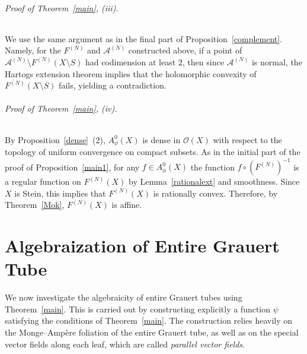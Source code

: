 \documentclass[a4paper, 12pt]{article}
\newcommand{\cO}{\mathcal{O}}
\newcommand{\cA}{\mathcal{A}}
\newtheorem{defn}[thm]{Definition}
\begin{document}
\paragraph{Proof of Theorem~\ref{main}, (iii).}
We use the same argument as in the final part of Proposition~\ref{complement}. Namely, for the $F^{(N)}$ and $\cA^{(N)}$ constructed above, if a point of $\cA^{(N)}\setminus F^{(N)}(X\setminus S)$ had codimension at least $2$, then since $\cA^{(N)}$ is normal, the Hartogs extension theorem implies that the holomorphic convexity of $F^{(N)}(X\setminus S)$ fails, yielding a contradiction.

\paragraph{Proof of Theorem~\ref{main}, (iv).}
By Proposition~\ref{dense}~(2), $A_\phi^0(X)$ is dense in $\cO(X)$ with respect to the topology of uniform convergence on compact subsets. As in the initial part of the proof of Proposition~\ref{main1}, for any $f \in A_\phi^0(X)$ the function $f \circ (F^{(N)})^{-1}$ is a regular function on $F^{(N)}(X)$ by Lemma~\ref{rationalext} and smoothness. Since $X$ is Stein, this implies that $F^{(N)}(X)$ is rationally convex. Therefore, by Theorem~\ref{Mok}, $F^{(N)}(X)$ is affine.

\part{Algebraization of Entire Grauert Tube}

We now investigate the algebraicity of entire Grauert tubes using Theorem~\ref{main}. This is carried out by constructing explicitly a function $\psi$ satisfying the conditions of Theorem~\ref{main}. The construction relies heavily on the Monge--Amp\`ere foliation of the entire Grauert tube, as well as on the special vector fields along each leaf, which are called \emph{parallel vector fields}.

\end{document}
